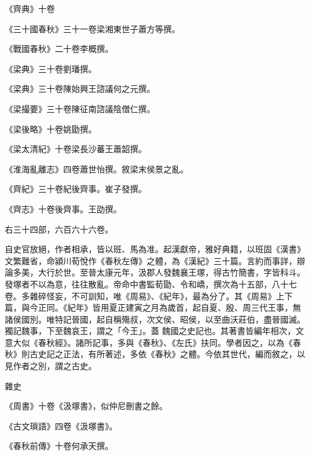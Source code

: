 \begin{pinyinscope}
 《齊典》十卷



 《三十國春秋》三十一卷梁湘東世子蕭方等撰。



 《戰國春秋》二十卷李概撰。



 《梁典》三十卷劉璠撰。



 《梁典》三十卷陳始興王諮議何之元撰。



 《梁撮要》三十卷陳征南諮議陰僧仁撰。



 《梁後略》十卷姚勖撰。



 《梁太清紀》十卷梁長沙蕃王蕭韶撰。



 《淮海亂離志》四卷蕭世怡撰。敘梁末侯景之亂。



 《齊紀》三十卷紀後齊事。崔子發撰。



 《齊志》十卷後齊事。王劭撰。



 右三十四部，六百六十六卷。



 自史官放絕，作者相承，皆以班、馬為准。起漢獻帝，雅好典籍，以班固《漢書》文繁難省，命潁川荀悅作《春秋左傳》之體，為《漢紀》三十篇。言約而事詳，辯論多美，大行於世。至晉太康元年，汲郡人發魏襄王塚，得古竹簡書，字皆科斗。發塚者不以為意，往往散亂。帝命中書監荀勖、令和嶠，撰次為十五部，八十七卷。多雜碎怪妄，不可訓知，唯《周易》、《紀年》，最為分了。其《周易》上下篇，與今正同。《紀年》皆用夏正建寅之月為歲首，起自夏、殷、周三代王事，無諸侯國別。唯特記晉國，起自稱殤叔，次文侯、昭侯，以至曲沃莊伯，盡晉國滅。獨記魏事，下至魏哀王，謂之「今王」。蓋
 魏國之史記也。其著書皆編年相次，文意大似《春秋經》。諸所記事，多與《春秋》、《左氏》扶同。學者因之，以為《春秋》則古史記之正法，有所著述，多依《春秋》之體。今依其世代，編而敘之，以見作者之別，謂之古史。



 雜史



 《周書》十卷《汲塚書》，似仲尼刪書之餘。



 《古文瑣語》四卷《汲塚書》。



 《春秋前傳》十卷何承天撰。




\end{pinyinscope}
